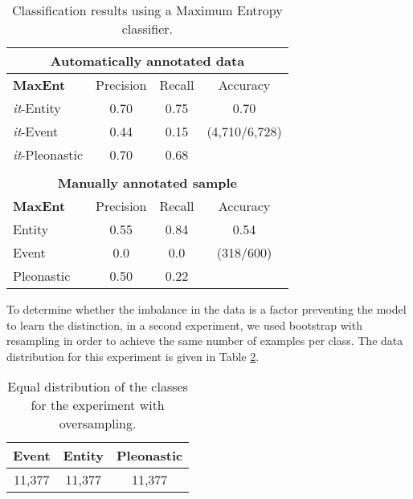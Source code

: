 \documentclass[10pt, a4paper]{article}
\begin{document}
\begin{center} \begin{table}[h!]\centering 
\begin{tabular}{l ccc}
\multicolumn{4}{c}{ \textbf{Automatically annotated data}}\\ 
\toprule
\textbf{MaxEnt}& Precision & Recall & Accuracy \\ 
\midrule 
\textit{it}-Entity &0.70 & 0.75 &   0.70\\
\textit{it}-Event & 0.44 & 0.15 & (4,710/6,728) \\
\textit{it}-Pleonastic & 0.70 & 0.68&   \\ 
\midrule & & & \\
\multicolumn{4}{c}{\textbf{Manually annotated sample}}  \\ 
\midrule
\textbf{MaxEnt}& Precision & Recall & Accuracy \\ 
\midrule 
Entity &0.55 & 0.84 &0.54\\ 
Event &0.0 & 0.0 & (318/600)\\ 
Pleonastic & 0.50 & 0.22 & \\ 
\bottomrule
\end{tabular} \caption{Classification results using a Maximum Entropy
classifier.} \label{tab:maxentautomatic}
\end{table}
\end{center}


To determine whether the imbalance in the data is a factor preventing the model 
to learn the distinction, in a second experiment, we used bootstrap with resampling in order to achieve the same number of examples per class. The data distribution for this experiment is given in Table \ref{tab:resamplingdata}.

\begin{table}[h!]\centering
\begin{tabular}{ccc}
\toprule
\textbf{Event} & \textbf{Entity} & \textbf{Pleonastic} \\
\midrule
11,377 & 11,377 & 11,377 \\
\bottomrule
\end{tabular}
\caption{Equal distribution of the classes for the experiment with 
oversampling.}\label{tab:resamplingdata}
\end{table}
\end{document}
